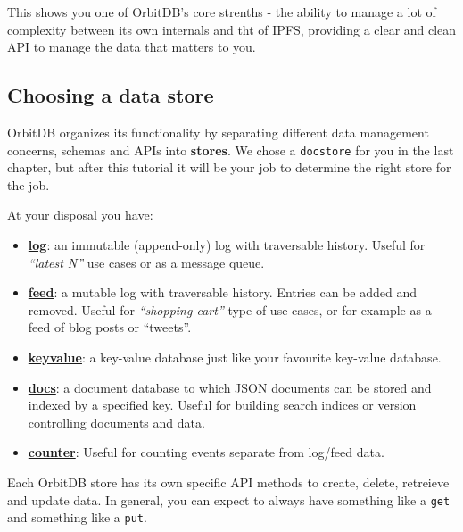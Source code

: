 This shows you one of OrbitDB's core strenths - the ability to manage a
lot of complexity between its own internals and tht of IPFS, providing a
clear and clean API to manage the data that matters to you.

\hypertarget{choosing-a-data-store}{\subsection{Choosing a data
store}\label{choosing-a-data-store}}

OrbitDB organizes its functionality by separating different data
management concerns, schemas and APIs into \textbf{stores}. We chose a
\texttt{docstore} for you in the last chapter, but after this tutorial
it will be your job to determine the right store for the job.

At your disposal you have:

\begin{itemize}
\tightlist
\item
  \textbf{\href{https://github.com/orbitdb/orbit-db/blob/master/API.md\#orbitdblognameaddress}{log}}:
  an immutable (append-only) log with traversable history. Useful for
  \emph{``latest N''} use cases or as a message queue.
\item
  \textbf{\href{https://github.com/orbitdb/orbit-db/blob/master/API.md\#orbitdbfeednameaddress}{feed}}:
  a mutable log with traversable history. Entries can be added and
  removed. Useful for \emph{``shopping cart''} type of use cases, or for
  example as a feed of blog posts or ``tweets''.
\item
  \textbf{\href{https://github.com/orbitdb/orbit-db/blob/master/API.md\#orbitdbkeyvaluenameaddress}{keyvalue}}:
  a key-value database just like your favourite key-value database.
\item
  \textbf{\href{https://github.com/orbitdb/orbit-db/blob/master/API.md\#orbitdbdocsnameaddress-options}{docs}}:
  a document database to which JSON documents can be stored and indexed
  by a specified key. Useful for building search indices or version
  controlling documents and data.
\item
  \textbf{\href{https://github.com/orbitdb/orbit-db/blob/master/API.md\#orbitdbcounternameaddress}{counter}}:
  Useful for counting events separate from log/feed data.
\end{itemize}

Each OrbitDB store has its own specific API methods to create, delete,
retreieve and update data. In general, you can expect to always have
something like a \texttt{get} and something like a \texttt{put}.


